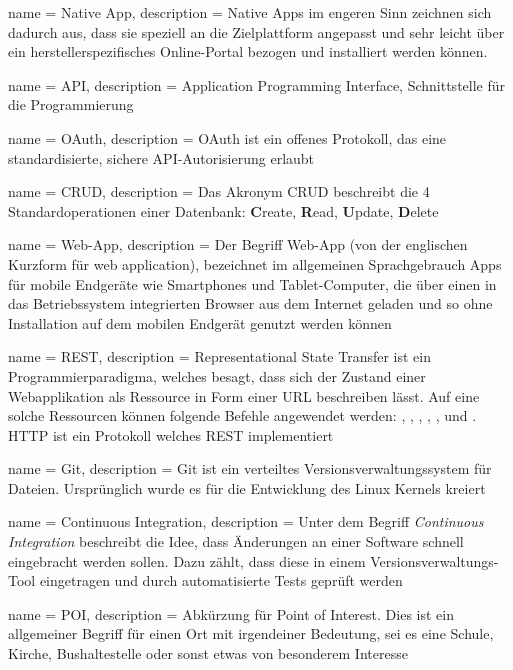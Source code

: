  {
	name = Native App,
	description = {Native Apps im engeren Sinn zeichnen sich dadurch aus, dass sie speziell an die Zielplattform angepasst und sehr leicht über ein herstellerspezifisches Online-Portal bezogen und installiert werden können.\cite{mobileapp}}
}

 {
	name = API,
	description = {Application Programming Interface, Schnittstelle für die Programmierung}
}

 {
	name = OAuth,
	description = {OAuth ist ein offenes Protokoll, das eine standardisierte, sichere API-Autorisierung erlaubt\cite{oauth}}
}

 {
	name = CRUD,
	description = {Das Akronym CRUD beschreibt die 4 Standardoperationen einer Datenbank: \textbf{C}reate, \textbf{R}ead, \textbf{U}pdate, \textbf{D}elete\cite{crud}}
}

 {
	name = Web-App,
	description = {Der Begriff Web-App (von der englischen Kurzform für web application), bezeichnet im allgemeinen Sprachgebrauch Apps für mobile Endgeräte wie Smartphones und Tablet-Computer, die über einen in das Betriebssystem integrierten Browser aus dem Internet geladen und so ohne Installation auf dem mobilen Endgerät genutzt werden können\cite{webapp}}
}

 {
	name = REST,
	description = {Representational State Transfer\cite{rest} ist ein Programmierparadigma, welches besagt, dass sich der Zustand einer Webapplikation als Ressource in Form einer URL beschreiben lässt. Auf eine solche Ressourcen können folgende Befehle angewendet werden: , , , , ,  und .
	HTTP ist ein Protokoll welches REST implementiert}
}

 {
	name = Git,
	description = {Git ist ein verteiltes Versionsverwaltungssystem für Dateien. Ursprünglich wurde es für die Entwicklung des Linux Kernels kreiert}
}

 {
	name = Continuous Integration,
	description = {Unter dem Begriff \emph{Continuous Integration}\cite{cont-integration} beschreibt die Idee, dass Änderungen an einer Software schnell eingebracht werden sollen. Dazu zählt, dass diese in einem Versionsverwaltungs-Tool eingetragen und durch automatisierte Tests geprüft werden}
}

 {
	name = POI,
	description = {Abkürzung für Point of Interest. Dies ist ein allgemeiner Begriff für einen Ort mit irgendeiner Bedeutung, sei es eine Schule, Kirche, Bushaltestelle oder sonst etwas von besonderem Interesse}
}

